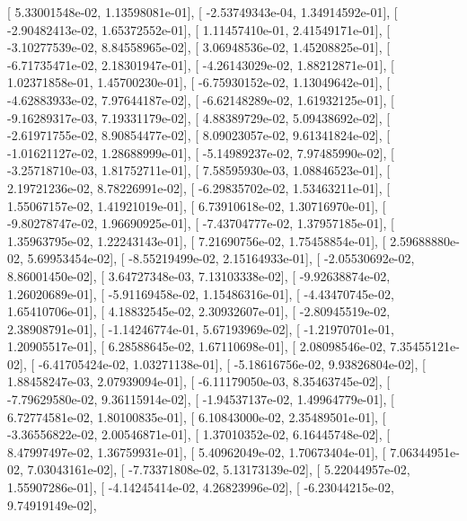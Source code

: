 \documentclass{article}
\begin{document}
       [  5.33001548e-02,   1.13598081e-01],
       [ -2.53749343e-04,   1.34914592e-01],
       [ -2.90482413e-02,   1.65372552e-01],
       [  1.11457410e-01,   2.41549171e-01],
       [ -3.10277539e-02,   8.84558965e-02],
       [  3.06948536e-02,   1.45208825e-01],
       [ -6.71735471e-02,   2.18301947e-01],
       [ -4.26143029e-02,   1.88212871e-01],
       [  1.02371858e-01,   1.45700230e-01],
       [ -6.75930152e-02,   1.13049642e-01],
       [ -4.62883933e-02,   7.97644187e-02],
       [ -6.62148289e-02,   1.61932125e-01],
       [ -9.16289317e-03,   7.19331179e-02],
       [  4.88389729e-02,   5.09438692e-02],
       [ -2.61971755e-02,   8.90854477e-02],
       [  8.09023057e-02,   9.61341824e-02],
       [ -1.01621127e-02,   1.28688999e-01],
       [ -5.14989237e-02,   7.97485990e-02],
       [ -3.25718710e-03,   1.81752711e-01],
       [  7.58595930e-03,   1.08846523e-01],
       [  2.19721236e-02,   8.78226991e-02],
       [ -6.29835702e-02,   1.53463211e-01],
       [  1.55067157e-02,   1.41921019e-01],
       [  6.73910618e-02,   1.30716970e-01],
       [ -9.80278747e-02,   1.96690925e-01],
       [ -7.43704777e-02,   1.37957185e-01],
       [  1.35963795e-02,   1.22243143e-01],
       [  7.21690756e-02,   1.75458854e-01],
       [  2.59688880e-02,   5.69953454e-02],
       [ -8.55219499e-02,   2.15164933e-01],
       [ -2.05530692e-02,   8.86001450e-02],
       [  3.64727348e-03,   7.13103338e-02],
       [ -9.92638874e-02,   1.26020689e-01],
       [ -5.91169458e-02,   1.15486316e-01],
       [ -4.43470745e-02,   1.65410706e-01],
       [  4.18832545e-02,   2.30932607e-01],
       [ -2.80945519e-02,   2.38908791e-01],
       [ -1.14246774e-01,   5.67193969e-02],
       [ -1.21970701e-01,   1.20905517e-01],
       [  6.28588645e-02,   1.67110698e-01],
       [  2.08098546e-02,   7.35455121e-02],
       [ -6.41705424e-02,   1.03271138e-01],
       [ -5.18616756e-02,   9.93826804e-02],
       [  1.88458247e-03,   2.07939094e-01],
       [ -6.11179050e-03,   8.35463745e-02],
       [ -7.79629580e-02,   9.36115914e-02],
       [ -1.94537137e-02,   1.49964779e-01],
       [  6.72774581e-02,   1.80100835e-01],
       [  6.10843000e-02,   2.35489501e-01],
       [ -3.36556822e-02,   2.00546871e-01],
       [  1.37010352e-02,   6.16445748e-02],
       [  8.47997497e-02,   1.36759931e-01],
       [  5.40962049e-02,   1.70673404e-01],
       [  7.06344951e-02,   7.03043161e-02],
       [ -7.73371808e-02,   5.13173139e-02],
       [  5.22044957e-02,   1.55907286e-01],
       [ -4.14245414e-02,   4.26823996e-02],
       [ -6.23044215e-02,   9.74919149e-02],
\end{document}
